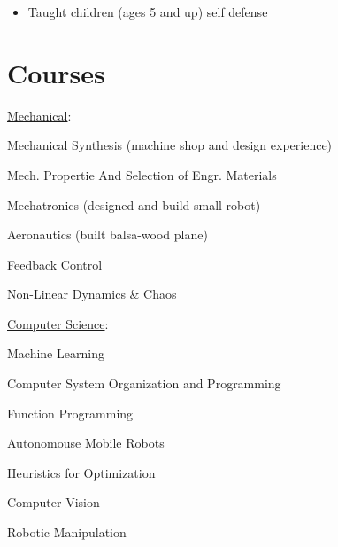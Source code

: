 \documentclass{BradyResume}
\begin{document}
\begin{itemize}
  \item Taught children (ages 5 and up) self defense
\end{itemize}

\section*{Courses}
\uline{Mechanical}:%
\begin{pipelist}
    \item Mechanical Synthesis (machine shop and design experience) 
    \item Mech. Propertie And Selection of Engr. Materials 
    \item Mechatronics (designed and build small robot) 
    \item Aeronautics (built balsa-wood plane) 
    \item Feedback Control 
    \item Non-Linear Dynamics \& Chaos 
\end{pipelist}
%
\uline{Computer Science}:%
\begin{pipelist}
    \item Machine Learning 
    \item Computer System Organization and Programming 
    \item Function Programming 
    \item Autonomouse Mobile Robots 
    \item Heuristics for Optimization 
    \item Computer Vision 
    \item Robotic Manipulation
\end{pipelist}
\end{document}

